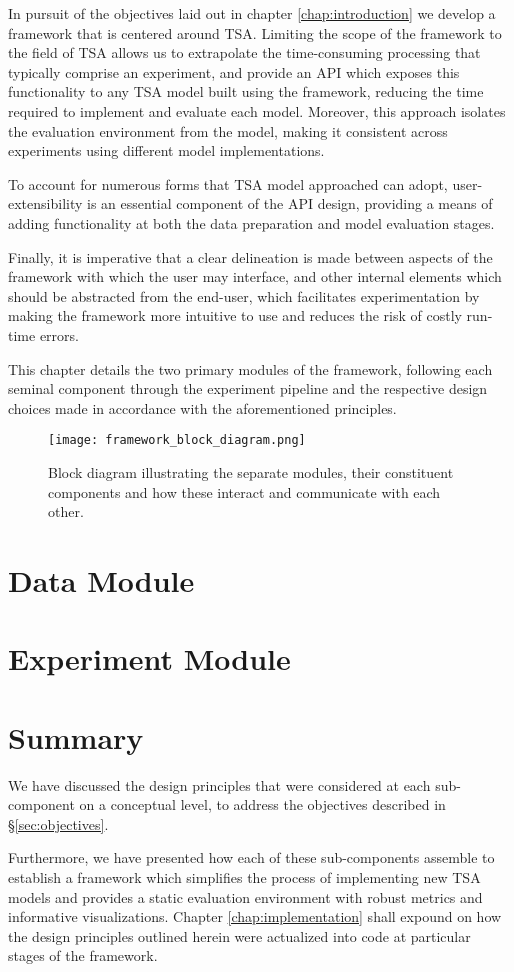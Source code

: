 \documentclass[../../fyp.tex]{subfiles}
\begin{document}
 
In pursuit of the objectives laid out in chapter \ref{chap:introduction} we develop a framework that is centered around TSA. Limiting the scope of the framework to the field of TSA allows us to extrapolate the time-consuming processing that typically comprise an experiment, and provide an API which exposes this functionality to any TSA model built using the framework, reducing the time required to implement and evaluate each model. Moreover, this approach isolates the evaluation environment from the model, making it consistent across experiments using different model implementations.

To account for numerous forms that TSA model approached can adopt, user-extensibility is an essential component of the API design, providing a means of adding functionality at both the data preparation and model evaluation stages. 

Finally, it is imperative that a clear delineation is made between aspects of the framework with which the user may interface, and other internal elements which should be abstracted from the end-user, which facilitates experimentation by making the framework more intuitive to use and reduces the risk of costly run-time errors.  

This chapter details the two primary modules of the framework, following each seminal component through the experiment pipeline and the respective design choices made in accordance with the aforementioned principles.

\begin{figure}[!ht]
	\texttt{[image: framework\_block\_diagram.png]}
	\caption{Block diagram illustrating the separate modules, their constituent components and how these interact and communicate with each other.}
	\label{fig:framework_block_diagram}
\end{figure}

\section{Data Module} \label{sec:data_module}


\section{Experiment Module} \label{sec:experiment_module}


\section{Summary}
We have discussed the design principles that were considered at each sub-component on a conceptual level, to address the objectives described in \S\ref{sec:objectives}. 

Furthermore, we have presented how each of these sub-components assemble to establish a framework which simplifies the process of implementing new TSA models and provides a static evaluation environment with robust metrics and informative visualizations. Chapter \ref{chap:implementation} shall expound on how the design principles outlined herein were actualized into code at particular stages of the framework.
\end{document}
